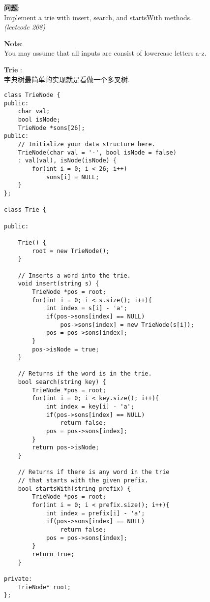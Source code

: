     
\begin{description}
    \item{\textbf{问题}}:\\
Implement a trie with insert, search, and startsWith methods.\\
\textit{(leetcode 208)}
    \item{\textbf{Note}}:\\
You may assume that all inputs are consist of lowercase letters a-z.
    \item{\textbf{Trie}} : 
	\\字典树最简单的实现就是看做一个多叉树.
    \begin{lstlisting}
class TrieNode {
public:
	char val;
	bool isNode;
	TrieNode *sons[26];
public:
    // Initialize your data structure here.
    TrieNode(char val = '-', bool isNode = false)
	: val(val), isNode(isNode) {
		for(int i = 0; i < 26; i++)
			sons[i] = NULL;
    }
};

class Trie {

public:

    Trie() {
        root = new TrieNode();
    }

    // Inserts a word into the trie.
    void insert(string s) {
		TrieNode *pos = root;
		for(int i = 0; i < s.size(); i++){
			int index = s[i] - 'a';
			if(pos->sons[index] == NULL)
				pos->sons[index] = new TrieNode(s[i]);
			pos = pos->sons[index];
		}
		pos->isNode = true;
    }

    // Returns if the word is in the trie.
    bool search(string key) {
		TrieNode *pos = root;
		for(int i = 0; i < key.size(); i++){
			int index = key[i] - 'a';
			if(pos->sons[index] == NULL)
				return false;
			pos = pos->sons[index];
		}
		return pos->isNode;
    }

	// Returns if there is any word in the trie
    // that starts with the given prefix.
    bool startsWith(string prefix) {
		TrieNode *pos = root;
		for(int i = 0; i < prefix.size(); i++){
			int index = prefix[i] - 'a';
			if(pos->sons[index] == NULL)
				return false;
			pos = pos->sons[index];
		}
		return true;
    }

private:
    TrieNode* root;
};
    \end{lstlisting}
\end{description}
